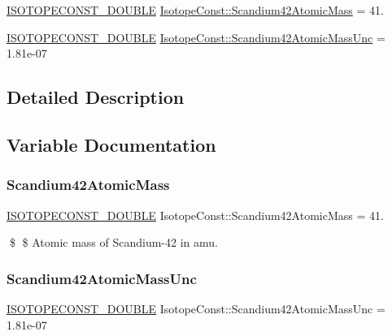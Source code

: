 \begin{DoxyCompactItemize}
\item 
\mbox{\hyperlink{group___isotope_const-_macros_ga8f45a7272ce02c0b4c65c44636ed719a}{I\+S\+O\+T\+O\+P\+E\+C\+O\+N\+S\+T\+\_\+\+D\+O\+U\+B\+LE}} \mbox{\hyperlink{group___isotope_const-_scandium-_sc42_ga9c4ae13b8a3c1db082d03f06bcb30421}{Isotope\+Const\+::\+Scandium42\+Atomic\+Mass}} = 41.
\item 
\mbox{\hyperlink{group___isotope_const-_macros_ga8f45a7272ce02c0b4c65c44636ed719a}{I\+S\+O\+T\+O\+P\+E\+C\+O\+N\+S\+T\+\_\+\+D\+O\+U\+B\+LE}} \mbox{\hyperlink{group___isotope_const-_scandium-_sc42_ga11077e854421628ebd21044f8e74c328}{Isotope\+Const\+::\+Scandium42\+Atomic\+Mass\+Unc}} = 1.\+81e-\/07
\end{DoxyCompactItemize}


\subsection{Detailed Description}


\subsection{Variable Documentation}
\mbox{\label{group___isotope_const-_scandium-_sc42_ga9c4ae13b8a3c1db082d03f06bcb30421}} 
\subsubsection{\texorpdfstring{Scandium42\+Atomic\+Mass}{Scandium42AtomicMass}}
{\footnotesize\ttfamily \mbox{\hyperlink{group___isotope_const-_macros_ga8f45a7272ce02c0b4c65c44636ed719a}{I\+S\+O\+T\+O\+P\+E\+C\+O\+N\+S\+T\+\_\+\+D\+O\+U\+B\+LE}} Isotope\+Const\+::\+Scandium42\+Atomic\+Mass = 41.}

\$ \$ Atomic mass of Scandium-\/42 in amu. \mbox{\label{group___isotope_const-_scandium-_sc42_ga11077e854421628ebd21044f8e74c328}} 
\subsubsection{\texorpdfstring{Scandium42\+Atomic\+Mass\+Unc}{Scandium42AtomicMassUnc}}
{\footnotesize\ttfamily \mbox{\hyperlink{group___isotope_const-_macros_ga8f45a7272ce02c0b4c65c44636ed719a}{I\+S\+O\+T\+O\+P\+E\+C\+O\+N\+S\+T\+\_\+\+D\+O\+U\+B\+LE}} Isotope\+Const\+::\+Scandium42\+Atomic\+Mass\+Unc = 1.\+81e-\/07}

